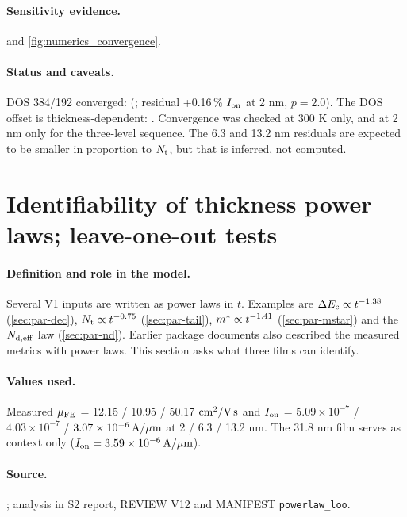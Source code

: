 \paragraph{Sensitivity evidence.}
 and \cref{fig:numerics_convergence}.

\paragraph{Status and caveats.}
DOS 384/192 converged:  (\evNUM; residual +0.16\,\% $I_{\mathrm{on}}$ at 2 nm, $p=2.0$). The DOS offset is thickness-dependent: . Convergence was checked at 300 K only, and at 2 nm only for the three-level sequence. The 6.3 and 13.2 nm residuals are expected to be smaller in proportion to $N_{\mathrm{t}}$, but that is inferred, not computed.

\section{Identifiability of thickness power laws; leave-one-out tests}\label{sec:der-powerlaw}

\paragraph{Definition and role in the model.}
Several V1 inputs are written as power laws in $t$. Examples are $\Delta E_{\mathrm{c}}\propto t^{-1.38}$ (\cref{sec:par-dec}), $N_{\mathrm{t}}\propto t^{-0.75}$ (\cref{sec:par-tail}), $m^{*}\propto t^{-1.41}$ (\cref{sec:par-mstar}) and the $N_{\mathrm{d,eff}}$ law (\cref{sec:par-nd}). Earlier package documents also described the measured metrics with power laws. This section asks what three films can identify.

\paragraph{Values used.}
Measured $\mu_{\mathrm{FE}}$ = 12.15 / 10.95 / 50.17\,$\,\mathrm{cm}^{2}/\mathrm{V\,s}$ and $I_{\mathrm{on}}$ = $5.09\times10^{-7}$ / $4.03\times10^{-7}$ / $3.07\times10^{-6}\,\mathrm{A}/\mu\mathrm{m}$ at 2 / 6.3 / 13.2 nm. The 31.8 nm film serves as context only ($I_{\mathrm{on}}=3.59\times10^{-6}\,\mathrm{A}/\mu\mathrm{m}$).

\paragraph{Source.}
\evDATA; analysis in S2 report, REVIEW V12 and MANIFEST \texttt{powerlaw\_loo}.

